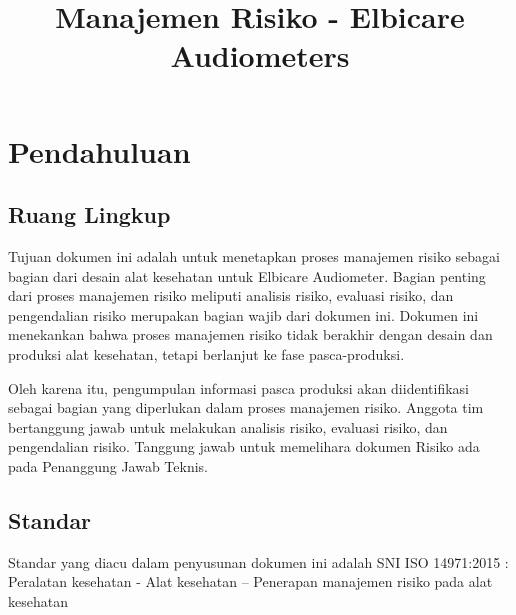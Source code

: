 \documentclass[11pt,a4paper,twoside,draft,onecolumn]{book}
\title{Manajemen Risiko - Elbicare Audiometers}
\begin{document}
	\maketitle
	\renewcommand\contentsname{Daftar Isi}
	\tableofcontents
	
	\renewcommand\listfigurename{Daftar Gambar}
	\listoffigures
	
	\renewcommand\listtablename{Daftar Tabel}
	\listoftables
	\newpage
	
	\renewcommand\chaptername{Bab}
	
	\chapter{Pendahuluan}
		\section{Ruang Lingkup}
		Tujuan dokumen ini adalah untuk menetapkan proses manajemen risiko sebagai bagian dari desain alat kesehatan untuk Elbicare Audiometer. Bagian penting dari proses manajemen risiko meliputi analisis risiko, evaluasi risiko, dan pengendalian risiko merupakan bagian wajib dari
		dokumen ini. Dokumen ini menekankan bahwa proses manajemen risiko tidak berakhir dengan desain dan produksi alat kesehatan, tetapi berlanjut ke fase pasca-produksi. 
		
		Oleh karena itu, pengumpulan informasi pasca produksi akan diidentifikasi sebagai bagian yang diperlukan dalam proses manajemen risiko. Anggota tim bertanggung jawab untuk melakukan analisis risiko, evaluasi risiko, dan pengendalian risiko. Tanggung jawab untuk memelihara dokumen Risiko ada pada Penanggung Jawab Teknis.
		
		\section{Standar}
		Standar yang diacu dalam penyusunan dokumen ini adalah SNI ISO 14971:2015 : Peralatan kesehatan - Alat kesehatan – Penerapan manajemen risiko pada alat kesehatan
		
\end{document}
